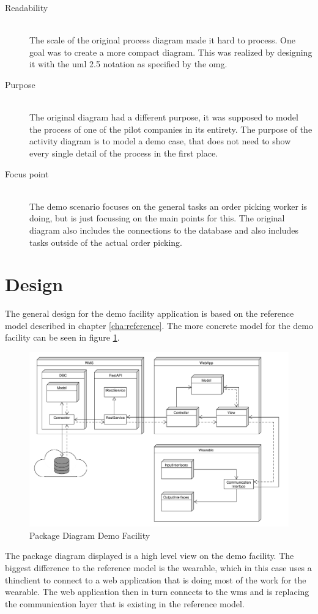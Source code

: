 \begin{description}
	\item[Readability] \hfill \\
	The scale of the original process diagram made it hard to process. One goal was to create a more compact diagram. This was realized by designing it with the \gls{uml} 2.5 notation as specified by the \gls{omg}. \citep{manual:umlnotation}
	\item[Purpose] \hfill \\
	The original diagram had a different purpose, it was supposed to model the process of one of the pilot companies in its entirety. The purpose of the activity diagram is to model a demo case, that does not need to show every single detail of the process in the first place.
	\item[Focus point] \hfill \\
	The demo scenario focuses on the general tasks an order picking worker is doing, but is just focussing on the main points for this. The original diagram also includes the connections to the database and also includes tasks outside of the actual order picking.
\end{description}

\section{Design}\label{sec:design}
The general design for the demo facility application is based on the reference model described in chapter \ref{cha:reference}. The more concrete model for the demo facility can be seen in figure \ref{fig:ClassDiagramL1}.

\begin{figure}[t]
	\includegraphics[width=\textwidth]{images/ClassDiagram_Level1}
	\caption{Package Diagram Demo Facility}
	\label{fig:ClassDiagramL1}
\end{figure}
The package diagram displayed is a high level view on the demo facility. The biggest difference to the reference model is the wearable, which in this case uses a \gls{thinclient} to connect to a web application that is doing most of the work for the wearable. The web application then in turn connects to the \gls{wms} and is replacing the communication layer that is existing in the reference model.

